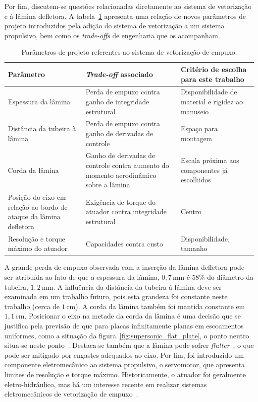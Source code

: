 Por fim, discutem-se questões relacionadas diretamente ao sistema de vetorização e à lâmina defletora. A tabela~\ref{tab:proj_params} apresenta uma relação de novos parâmetros de projeto introduzidos pela adição do sistema de vetorização a um sistema propulsivo, bem como os \textit{trade-offs} de engenharia que os acompanham.

\begin{table}[htbp]
    \centering\begin{tabular}{p{.3\linewidth}p{.3\linewidth}p{.3\linewidth}} \toprule
        Parâmetro & \textit{Trade-off} associado & Critério de escolha para este trabalho \\[.3cm] \midrule
        Espessura da lâmina & Perda de empuxo contra ganho de integridade estrutural & Disponibilidade de material e rigidez ao manuseio  \\[.3cm]
        Distância da tubeira à lâmina & Perda de empuxo contra ganho de derivadas de controle & Espaço para montagem\\[.3cm]
        Corda da lâmina & Ganho de derivadas de controle contra aumento do momento aerodinâmico sobre a lâmina & Escala próxima aos componentes já escolhidos\\[.3cm]
        Posição do eixo em relação ao bordo de ataque da lâmina defletora & Exigência de torque do atuador contra integridade estrutural & Centro\\[.3cm]
        Resolução e torque máximo do atuador & Capacidades contra custo & Disponibilidade, tamanho \\ \bottomrule
    \end{tabular}
    \caption{Parâmetros de projeto referentes ao sistema de vetorização de empuxo.}\label{tab:proj_params}
\end{table}

A grande perda de empuxo observada com a inserção da lâmina defletora pode ser atribuída ao fato de que a espessura da lâmina, \(0,7\,\mathrm{mm}\) é 58\% do diâmetro da tubeira, \(1,2\,\mathrm{mm}\). A influência da distância da tubeira à lâmina deve ser examinada em um trabalho futuro, pois esta grandeza foi constante neste trabalho (cerca de \(1\,\mathrm{cm}\)). A corda da lâmina também foi mantida constante em \(1,1\,\mathrm{cm}\). Posicionar o eixo na metade da corda da lâmina é uma decisão que se justifica pela previsão de que para placas infinitamente planas em escoamentos uniformes, como a situação da figura~\ref{fig:supersonic_flat_plate}, o ponto neutro situa-se neste ponto~\cite{anderson}. Destaca-se também que a lâmina pode sofrer \textit{flutter}~\cite{flutter}, o que pode ser mitigado por engastes adequados ao eixo. Por fim, foi introduzido um componente eletromecânico ao sistema propulsivo, o servomotor, que apresenta limites de resolução e torque máximo. Historicamente, o atuador foi geralmente eletro-hidráulico, mas há um interesse recente em realizar sistemas eletromecânicos de vetorização de empuxo~\cite{etvc}.